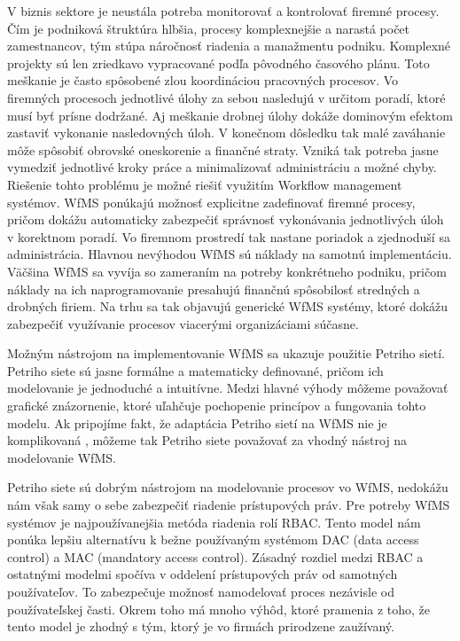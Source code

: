 
V biznis sektore je neustála potreba monitorovať a kontrolovať firemné procesy. Čím je podniková štruktúra hlbšia, procesy komplexnejšie a narastá počet zamestnancov, tým stúpa náročnosť riadenia a manažmentu podniku. Komplexné projekty sú len zriedkavo vypracované podľa pôvodného časového plánu. Toto meškanie je často spôsobené zlou koordináciou pracovných procesov. Vo firemných  procesoch jednotlivé úlohy za sebou nasledujú v určitom poradí, ktoré musí byť prísne dodržané. Aj meškanie drobnej úlohy dokáže dominovým efektom zastaviť vykonanie nasledovných úloh. V konečnom dôsledku tak malé zaváhanie môže spôsobiť obrovské oneskorenie a finančné straty.   Vzniká tak potreba jasne vymedziť jednotlivé kroky práce a minimalizovať administráciu a možné chyby. Riešenie tohto problému je možné riešiť využitím Workflow management systémov.  WfMS ponúkajú možnosť explicitne zadefinovať firemné procesy, pričom dokážu automaticky zabezpečiť správnosť vykonávania jednotlivých úloh v korektnom poradí. Vo firemnom prostredí tak nastane poriadok a zjednoduší sa administrácia. Hlavnou nevýhodou WfMS sú náklady na samotnú implementáciu. Väčšina WfMS sa vyvíja so zameraním na potreby konkrétneho podniku, pričom náklady na ich naprogramovanie presahujú finančnú spôsobilosť stredných a drobných firiem. Na trhu sa tak objavujú generické WfMS systémy, ktoré dokážu zabezpečiť využívanie procesov viacerými organizáciami súčasne. 

Možným nástrojom na implementovanie WfMS sa ukazuje použitie Petriho sietí. Petriho siete sú jasne formálne a matematicky definované, pričom ich modelovanie je jednoduché a intuitívne. Medzi hlavné výhody môžeme považovať grafické znázornenie, ktoré uľahčuje pochopenie princípov a fungovania tohto modelu. Ak pripojíme fakt, že adaptácia Petriho sietí na WfMS nie je komplikovaná , môžeme tak Petriho siete považovať za vhodný nástroj na modelovanie WfMS. 

Petriho siete sú dobrým nástrojom na modelovanie procesov vo WfMS, nedokážu nám však samy o sebe zabezpečiť riadenie prístupových práv. Pre potreby WfMS systémov je najpoužívanejšia metóda riadenia rolí RBAC. Tento model nám ponúka lepšiu alternatívu k bežne používaným systémom DAC (data access control) a MAC (mandatory access control). Zásadný rozdiel medzi RBAC a ostatnými modelmi spočíva v oddelení prístupových práv od samotných používateľov. To zabezpečuje možnosť namodelovať proces nezávisle od používateľskej časti. Okrem toho má mnoho výhôd, ktoré pramenia z toho, že tento model je zhodný s tým, ktorý je vo firmách prirodzene zaužívaný.



